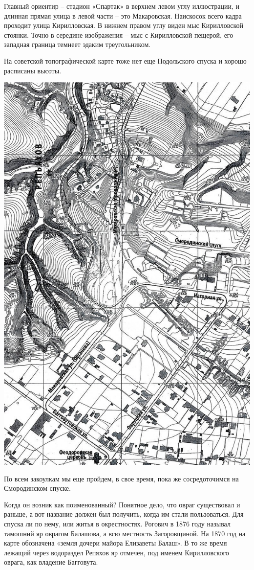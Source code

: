 Главный ориентир – стадион «Спартак» в верхнем левом углу иллюстрации, и длинная прямая улица в левой части – это Макаровская. Наискосок всего кадра проходит улица Кирилловская. В нижнем правом углу виден мыс Кирилловской стоянки. Точно в середине изображения – мыс с Кирилловской пещерой, его западная граница темнеет эдаким треугольником.

На советской топографической карте тоже нет еще Подольского спуска и хорошо расписаны высоты.

\begin{center}
\includegraphics[width=0.80\linewidth]{chast-zmiy/karta-opis/sov-map.jpg}
\end{center}

 По всем закоулкам мы еще пройдем, в свое время, пока же сосредоточимся на Смородинском спуске.

Когда он возник как поименованный? Понятное дело, что овраг существовал и раньше, а вот название должен был получить, когда им стали пользоваться. Для спуска ли по нему, или житья в окрестностях. Рогович в 1876 году называл тамошний яр оврагом Балашова, а всю местность Загоровщиной. На 1870 год на карте обозначена «земля дочери майора Елизаветы Балаш». В то же время лежащий через водораздел Репяхов яр отмечен, под именем Кирилловского оврага, как владение Багговута.

